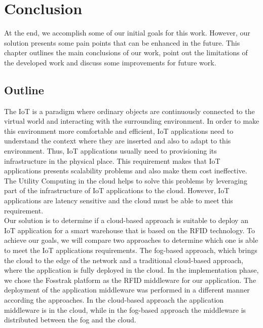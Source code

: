 
\chapter{Conclusion}
\label{chapter:conclusion}
At the end, we accomplish some of our initial goals for this work. However, our solution presents some
pain points that can be enhanced in the future. This chapter outlines the main conclusions of our work,
point out the limitations of the developed work and discuss some improvements for future work.

\section{Outline}
\label{sec:outline}
The \acrfull{IoT} is a paradigm where ordinary objects are continuously connected to the virtual
world and interacting with the surrounding environment. In order to make this environment more comfortable and
efficient, \gls{IoT} applications need to understand the context where they are inserted and also to
adapt to this environment. Thus, \gls{IoT} applications usually need to provisioning its infrastructure
in the physical place. This requirement makes that \gls{IoT} applications presents scalability
problems and also make them cost ineffective. The Utility Computing in the cloud helps to solve this
problems by leveraging part of the infrastructure of \gls{IoT} applications to the cloud. However,
\gls{IoT} applications are latency sensitive and the cloud must be able to meet this requirement.\\

Our solution is to determine if a cloud-based approach is suitable to deploy an \gls{IoT} application
for a smart warehouse that is based on the \gls{RFID} technology. To achieve our goals, we will
compare two approaches to determine which one is able to meet the \gls{IoT} applications requirements.
The fog-based approach, which brings the cloud to the edge of the network and a traditional cloud-based
approach, where the application is fully deployed in the cloud. In the implementation phase, we chose
the Fosstrak platform as the \gls{RFID} middleware for our application. The deployment of the
application middleware was performed in a different manner according the approaches. In the cloud-based
approach the application middleware is in the cloud, while in the fog-based approach the middleware
is distributed between the fog and the cloud.\\

